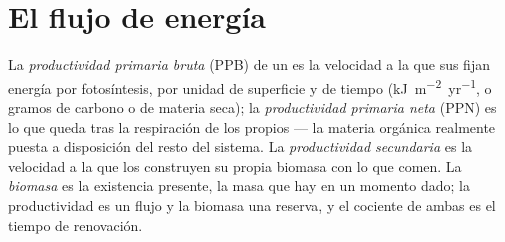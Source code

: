 \section{El flujo de energía}

\begin{definition}[Productividad]\label{def:b1:ecosystem-organization:productivity}
La \emph{productividad primaria bruta} (PPB) de un  es la
velocidad a la que sus  fijan energía por fotosíntesis, por
unidad de superficie y de tiempo (\unit{kJ.m^{-2}.yr^{-1}}, o gramos de
carbono o de materia seca); la \emph{productividad primaria neta} (PPN) es
lo que queda tras la respiración de los propios  --- la materia
orgánica realmente puesta a disposición del resto del sistema. La
\emph{productividad secundaria} es la velocidad a la que los 
construyen su propia biomasa con lo que comen. La \emph{biomasa} es la
existencia presente, la masa que hay en un momento dado; la productividad es
un flujo y la biomasa una reserva, y el cociente de ambas es el tiempo de
renovación.
\end{definition}

